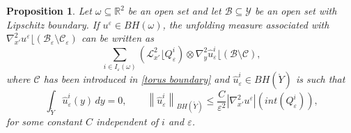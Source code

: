\documentclass[reqno,10pt]{amsart}
\numberwithin{equation}{section}
\newtheorem{proposition}[theorem]{Proposition}
\theoremstyle{remark}
\newcommand{\calB}{\mathcal{B}}
\newcommand{\calC}{\mathcal{C}}
\newcommand{\calH}{\mathcal{H}}
\newcommand{\calL}{\mathcal{L}}
\newcommand{\R}{\mathbb{R}}
\newcommand{\calY}{\mathcal{Y}}
\newcommand{\weakstar}{\xrightharpoonup{*}}
\newcommand{\eps}{\varepsilon}
\newcommand{\mres}[1]{\lfloor{#1}}
\newcommand{\E}{{\bf E}}
\newcommand{\D}{\nabla}
\begin{document}
\begin{proposition} \label{associated unfolding measure BH}
Let $\omega \subseteq \R^2$ be an open set and let $\calB \subseteq \calY$ be an open set with Lipschitz boundary. 
If $u^\eps \in BH(\omega)$, the unfolding measure associated with ${\D}^2_{x'}u^\eps\mres{(\calB_\eps \setminus \calC_\eps)}$ can be written as
\begin{equation} \label{unfolding Hessian}
	\sum_{i \in I_\eps(\omega)} \left( \calL_{x'}^2\mres{Q_\eps^i} \right) \otimes {\D}^2_{y}\hat{u}_\eps^i\mres{(\calB \setminus \calC)},
\end{equation}
where $\calC$ has been introduced in \eqref{torus boundary} and $\hat{u}_\eps^i \in BH(\mathring{Y})$ is such that
\begin{equation} \label{unfolding inequality BH}
	\int_{\mathring{Y}} \hat{u}_\eps^i(y)\,dy=0, \qquad \left\|\hat{u}_\eps^i\right\|_{BH(\mathring{Y})}
	\leq \frac{C}{\eps^2} |{\D}^2_{x'}u^\eps|\left(int(Q_\eps^i)\right),
\end{equation}
for some constant $C$ independent of $i$ and $\eps$.
\end{proposition}

\end{document}
